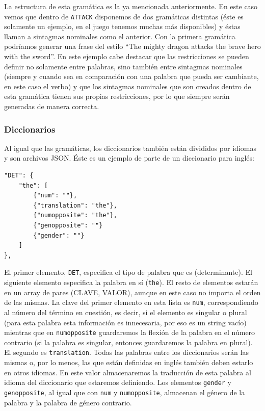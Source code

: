 \noindent La estructura de esta gramática es la ya mencionada anteriormente. En este caso vemos que dentro de \texttt{ATTACK} disponemos de dos gramáticas distintas (éste es solamente un ejemplo, en el juego tenemos muchas más disponibles) y éstas llaman a sintagmas nominales como el anterior.
Con la primera gramática podríamos generar una frase del estilo ``The mighty dragon attacks the brave hero with the sword''. En este ejemplo cabe destacar que las restricciones se pueden definir no solamente entre palabras, sino también entre sintagmas nominales (siempre y cuando sea en comparación con una palabra que pueda ser cambiante, en este caso el verbo) y que los sintagmas nominales que son creados dentro de esta gramática tienen sus propias restricciones, por lo que siempre serán generadas de manera correcta.

\subsubsection{Diccionarios}

Al igual que las gramáticas, los diccionarios también están divididos por idiomas y son archivos JSON. Éste es un ejemplo de parte de un diccionario para inglés:

\begin{lstlisting}[style=json]
"DET": {
    "the": [
        {"num": ""},
        {"translation": "the"},
        {"numopposite": "the"},
        {"genopposite": ""}
        {"gender": ""}
    ]
},
\end{lstlisting}

\noindent El primer elemento, \texttt{DET}, especifica el tipo de palabra que es (determinante). El siguiente elemento especifica la palabra en sí (\texttt{the}). El resto de elementos estarán en un array de pares (CLAVE, VALOR), aunque en este caso no importa el orden de las mismas. La clave del primer elemento en esta lista es \texttt{num}, correspondiendo al número del término en cuestión, es decir, si el elemento es singular o plural (para esta palabra esta información es innecesaria, por eso es un string vacío) mientras que en \texttt{numopposite} guardaremos la flexión de la palabra en el número contrario (si la palabra es singular, entonces guardaremos la palabra en plural).
El segundo es \texttt{translation}. Todas las palabras entre los diccionarios serán las mismas o, por lo menos, las que están definidas en inglés también deben estarlo en otros idiomas. En este valor almacenaremos la traducción de esta palabra al idioma del diccionario que estaremos definiendo.
Los elementos \texttt{gender} y \texttt{genopposite}, al igual que con \texttt{num} y \texttt{numopposite}, almacenan el género de la palabra y la palabra de género contrario.

